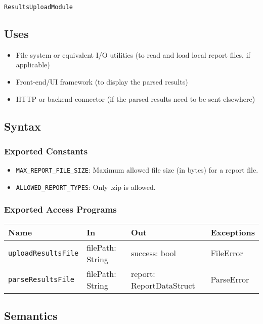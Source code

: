 \documentclass[12pt, titlepage]{article}
\begin{document}
\texttt{ResultsUploadModule}

\subsection{Uses}

\begin{itemize}
    \item File system or equivalent I/O utilities (to read and load local report files, if applicable)
    \item Front-end/UI framework (to display the parsed results)
    \item HTTP or backend connector (if the parsed results need to be sent elsewhere)
\end{itemize}

\subsection{Syntax}

\subsubsection{Exported Constants}

\begin{itemize}
    \item \texttt{MAX\_REPORT\_FILE\_SIZE}: Maximum allowed file size (in bytes) for a report file.
    \item \texttt{ALLOWED\_REPORT\_TYPES}: Only .zip is allowed.
\end{itemize}

\subsubsection{Exported Access Programs}

\begin{center}
\begin{tabular}{p{5cm} p{3.5cm} p{3.5cm} p{2cm}}
\hline
\textbf{Name} & \textbf{In} & \textbf{Out} & \textbf{Exceptions} \\
\hline
\texttt{uploadResultsFile} & filePath: String & success: bool & FileError \\
\texttt{parseResultsFile} & filePath: String & report: ReportDataStruct & ParseError \\
\hline
\end{tabular}
\end{center}

\subsection{Semantics}
\end{document}
